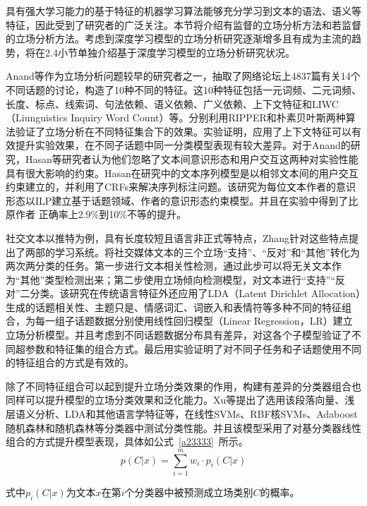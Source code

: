具有强大学习能力的基于特征的机器学习算法能够充分学习到文本的语法、语义等特征，因此受到了研究者的广泛关注。本节将介绍有监督的立场分析方法和若监督的立场分析方法。考虑到深度学习模型的立场分析研究逐渐增多且有成为主流的趋势，将在2.4小节单独介绍基于深度学习模型的立场分析研究状况。



Anand等作为立场分析问题较早的研究者之一，抽取了网络论坛上4837篇有关14个不同话题的讨论，构造了10种不同的特征。这10种特征包括一元词频、二元词频、长度、标点、线索词、句法依赖、语义依赖、广义依赖、上下文特征和LIWC（Liunguistics Inquiry Word Count）等。分别利用RIPPER和朴素贝叶斯两种算法验证了立场分析在不同特征集合下的效果。实验证明，应用了上下文特征可以有效提升实验效果，在不同子话题中同一分类模型表现有较大差异。对于Anand的研究，Hasan等研究者认为他们忽略了文本间意识形态和用户交互这两种对实验性能具有很大影响的约束。Hasan在研究中的文本序列模型是以相邻文本间的用户交互约束建立的，并利用了CRFs来解决序列标注问题。该研究为每位文本作者的意识形态以ILP建立基于话题领域、作者的意识形态约束模型。并且在实验中得到了比原作者	正确率上2.9\%到10\%不等的提升。

社交文本以推特为例，具有长度较短且语言非正式等特点，Zhang针对这些特点提出了两部的学习系统。将社交媒体文本的三个立场“支持”、“反对”和“其他”转化为两次两分类的任务。第一步进行文本相关性检测，通过此步可以将无关文本作为“其他”类型检测出来；第二步使用立场倾向检测模型，对文本进行“支持”“反对”二分类。该研究在传统语言特征外还应用了LDA（Latent Dirichlet Allocation）生成的话题相关性、主题只是、情感词汇、词嵌入和表情符等多种不同的特征组合，为每一组子话题数据分别使用线性回归模型（Linear Regression，LR）建立立场分析模型。并且考虑到不同话题数据分布具有差异，对这各个子模型验证了不同超参数和特征集的组合方式。最后用实验证明了对不同子任务和子话题使用不同的特征组合的方式是有效的。

除了不同特征组合可以起到提升立场分类效果的作用，构建有差异的分类器组合也同样可以提升模型的立场分类效果和泛化能力。Xu等提出了选用该段落向量、浅层语义分析、LDA和其他语言学特征等，在线性SVMs、RBF核SVMs、Adaboost随机森林和随机森林等分类器中测试分类性能。并且该模型采用了对基分类器线性组合的方式提升模型表现，具体如公式~\ref{a23333}~所示。
\begin{equation}\label{a23333}
p(C|x)=\sum_{i=1}^m w_i \cdot p_i(C|x)
\end{equation}

式中$p_i(C|x)$为文本$x$在第$i$个分类器中被预测成立场类别$C$的概率。

